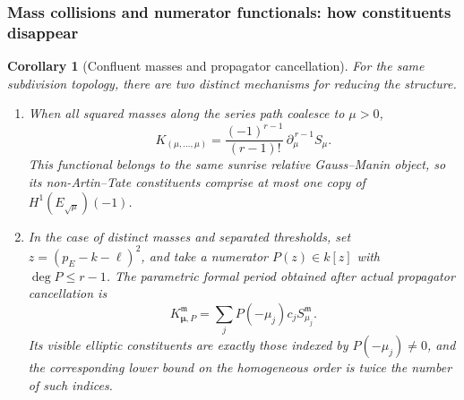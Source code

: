 \documentclass[11pt,a4paper,oneside]{article}
\theoremstyle{plain}
\newtheorem{corollary}[theorem]{Corollary}
\theoremstyle{definition}
\theoremstyle{remark}
\numberwithin{equation}{section}
\begin{document}
\subsubsection{Mass collisions and numerator functionals: how constituents disappear}
\begin{corollary}[Confluent masses and propagator cancellation]\label{unified:cor:seriesselect}
For the same subdivision topology, there are two distinct mechanisms for reducing the structure.
\begin{enumerate}
\item When all squared masses along the series path coalesce to $\mu>0$,
\[
 K_{(\mu,\ldots,\mu)}
   =\frac{(-1)^{r-1}}{(r-1)!}\,\partial_\mu^{\,r-1}S_\mu .
\]
This functional belongs to the same sunrise relative Gauss--Manin object,
so its non-Artin--Tate constituents comprise at most one copy of $H^1(E_{\sqrt\mu})(-1)$.
\item In the case of distinct masses and separated thresholds, set $z=(p_E-k-\ell)^2$,
and take a numerator $P(z)\in k[z]$ with $\deg P\le r-1$.
The parametric formal period obtained after actual propagator cancellation is
\[
 K_{\boldsymbol\mu,P}^{\mathfrak m}
    =\sum_j P(-\mu_j)c_jS_{\mu_j}^{\mathfrak m}.
\]
Its visible elliptic constituents are exactly those indexed by $P(-\mu_j)\ne0$,
and the corresponding lower bound on the homogeneous order is twice the number of such indices.
\end{enumerate}
\end{corollary}
\end{document}
